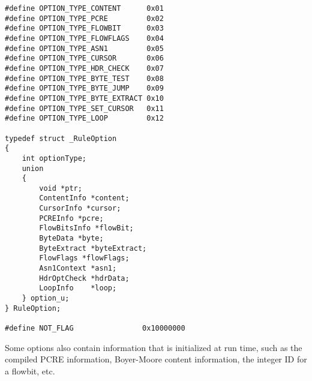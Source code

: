 \documentclass[english]{report}
\begin{document}
\begin{verbatim}
#define OPTION_TYPE_CONTENT      0x01
#define OPTION_TYPE_PCRE         0x02
#define OPTION_TYPE_FLOWBIT      0x03
#define OPTION_TYPE_FLOWFLAGS    0x04
#define OPTION_TYPE_ASN1         0x05
#define OPTION_TYPE_CURSOR       0x06
#define OPTION_TYPE_HDR_CHECK    0x07
#define OPTION_TYPE_BYTE_TEST    0x08
#define OPTION_TYPE_BYTE_JUMP    0x09
#define OPTION_TYPE_BYTE_EXTRACT 0x10
#define OPTION_TYPE_SET_CURSOR   0x11
#define OPTION_TYPE_LOOP         0x12

typedef struct _RuleOption
{
    int optionType;
    union
    {
        void *ptr;
        ContentInfo *content;
        CursorInfo *cursor;
        PCREInfo *pcre;
        FlowBitsInfo *flowBit;
        ByteData *byte;
        ByteExtract *byteExtract;
        FlowFlags *flowFlags;
        Asn1Context *asn1;
        HdrOptCheck *hdrData;
        LoopInfo    *loop;
    } option_u;
} RuleOption;

#define NOT_FLAG                0x10000000
\end{verbatim}

Some options also contain information that is initialized at run
time, such as the compiled PCRE information, Boyer-Moore content
information, the integer ID for a flowbit, etc.
\end{document}
